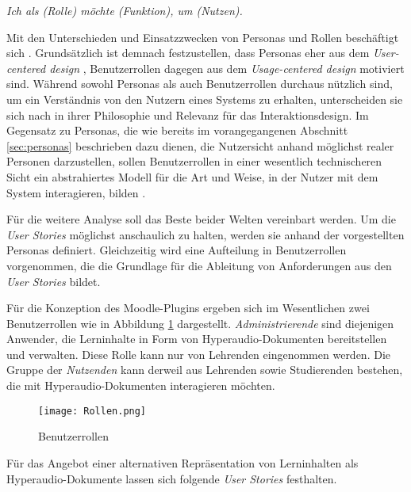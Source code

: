 \par
\begingroup
\leftskip=1cm
\rightskip=1.5cm
\noindent

\textit{Ich als (Rolle) möchte (Funktion), um (Nutzen).}

\par
\endgroup

\vspace{.3cm}

Mit den Unterschieden und Einsatzzwecken von Personas und Rollen beschäftigt sich \cite{constantine2006users}. Grundsätzlich ist demnach festzustellen, dass Personas eher aus dem \textit{User-centered design} \citep{Norman1986user}, Benutzerrollen dagegen aus dem \textit{Usage-centered design} \citep{Constantine1996usage} motiviert sind. Während sowohl Personas als auch Benutzerrollen durchaus nützlich sind, um ein Verständnis von den Nutzern eines Systems zu erhalten, unterscheiden sie sich nach \cite{constantine2006users} in ihrer Philosophie und Relevanz für das Interaktionsdesign. Im Gegensatz zu Personas, die wie bereits im vorangegangenen Abschnitt \ref{sec:personas} beschrieben dazu dienen, die Nutzersicht anhand möglichst realer Personen darzustellen, sollen Benutzerrollen in einer wesentlich technischeren Sicht ein abstrahiertes Modell für die Art und Weise, in der Nutzer mit dem System interagieren, bilden \citep{constantine2006users}.

Für die weitere Analyse soll das Beste beider Welten vereinbart werden. Um die \textit{User Stories} möglichst anschaulich zu halten, werden sie anhand der vorgestellten Personas definiert. Gleichzeitig wird eine Aufteilung in Benutzerrollen vorgenommen, die die Grundlage für die Ableitung von Anforderungen aus den \textit{User Stories} bildet.

Für die Konzeption des Moodle-Plugins ergeben sich im Wesentlichen zwei Benutzerrollen wie in Abbildung \ref{fig:Rollen} dargestellt. \textit{Administrierende} sind diejenigen Anwender, die Lerninhalte in Form von Hyperaudio-Dokumenten bereitstellen und verwalten. Diese Rolle kann nur von Lehrenden eingenommen werden. Die Gruppe der \textit{Nutzenden} kann derweil aus Lehrenden sowie Studierenden bestehen, die mit Hyperaudio-Dokumenten interagieren möchten.

\begin{figure}[h!]
\texttt{[image: Rollen.png]}
\caption{\label{fig:Rollen}Benutzerrollen}
\end{figure}


Für das Angebot einer alternativen Repräsentation von Lerninhalten als Hyperaudio-Dokumente lassen sich folgende \textit{User Stories} festhalten.

